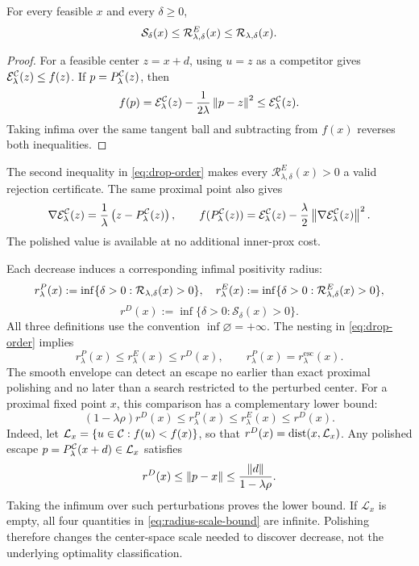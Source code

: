 \begin{lemma}
  \label{lem:drop-order}
  For every feasible \(x\) and every \(\delta\ge0\),
  \begin{equation}
    \mathcal{S}_\delta(x)
    \le
    \mathcal{R}^{E}_{\lambda,\delta}(x)
    \le
    \mathcal{R}_{\lambda,\delta}(x).
    \label{eq:drop-order}
  \end{equation}
\end{lemma}

\begin{proof}
  For a feasible center \(z=x+d\), using \(u=z\) as a competitor gives
  \(\mathcal{E}_\lambda^{\mathcal{C}}(z)\le f(z)\).  If
  \(p=P_\lambda^{\mathcal{C}}(z)\), then
  \[
    f(p)
    =
    \mathcal{E}_\lambda^{\mathcal{C}}(z)
    -\frac{1}{2\lambda}\left\lVert p-z\right\rVert^{2}
    \le\mathcal{E}_\lambda^{\mathcal{C}}(z).
  \]
  Taking infima over the same tangent ball and subtracting from \(f(x)\)
  reverses both inequalities.
\end{proof}

The second inequality in \cref{eq:drop-order} makes every
\(\mathcal{R}^{E}_{\lambda,\delta}(x)>0\) a valid rejection certificate.  The
same proximal point also gives
\begin{equation}
  \nabla\mathcal{E}_\lambda^{\mathcal{C}}(z)
  =
  \frac{1}{\lambda}
  \left(z-P_\lambda^{\mathcal{C}}(z)\right),
  \qquad
  f(P_\lambda^{\mathcal{C}}(z))
  =
  \mathcal{E}_\lambda^{\mathcal{C}}(z)
  -\frac{\lambda}{2}
       \left\lVert \nabla\mathcal{E}_\lambda^{\mathcal{C}}(z)\right\rVert^{2}.
  \label{eq:recovery-identity}
\end{equation}
The polished value is available at no additional inner-prox cost.

Each decrease induces a corresponding infimal positivity radius:
\[
  r_{\lambda}^{P}(x)
  :=\inf\{\delta>0:\mathcal{R}_{\lambda,\delta}(x)>0\},\quad
  r_{\lambda}^{E}(x)
  :=\inf\{\delta>0:\mathcal{R}^{E}_{\lambda,\delta}(x)>0\},
\]
\[
  r^{D}(x)
  :=\inf\{\delta>0:\mathcal{S}_{\delta}(x)>0\}.
\]
All three definitions use the convention \(\inf\varnothing=+\infty\).
The nesting in \cref{eq:drop-order} implies
\begin{equation}
  r_{\lambda}^{P}(x)
  \le r_{\lambda}^{E}(x)
  \le r^{D}(x),
  \qquad
  r_{\lambda}^{P}(x)=r_{\lambda}^{\mathrm{esc}}(x).
  \label{eq:radius-order}
\end{equation}
The smooth envelope can detect an escape no earlier than exact proximal
polishing and no later than a search restricted to the perturbed center.
For a proximal fixed point \(x\), this comparison has a complementary
lower bound:
\begin{equation}
  (1-\lambda\rho)r^D(x)
  \le r_\lambda^P(x)\le r_\lambda^E(x)\le r^D(x).
  \label{eq:radius-scale-bound}
\end{equation}
Indeed, let \(\mathcal L_x=\{u\in\mathcal{C}:f(u)<f(x)\}\), so that
\(r^D(x)=\operatorname{dist}(x,\mathcal L_x)\).  Any polished escape
\(p=P_\lambda^{\mathcal{C}}(x+d)\in\mathcal L_x\) satisfies
\[
  r^D(x)\le\left\lVert p-x\right\rVert
  \le\frac{\left\lVert d\right\rVert}{1-\lambda\rho}.
\]
Taking the infimum over such perturbations proves the lower bound.  If
\(\mathcal L_x\) is empty, all four quantities in
\cref{eq:radius-scale-bound} are infinite.  Polishing therefore changes
the center-space scale needed to discover decrease, not the underlying
optimality classification.

